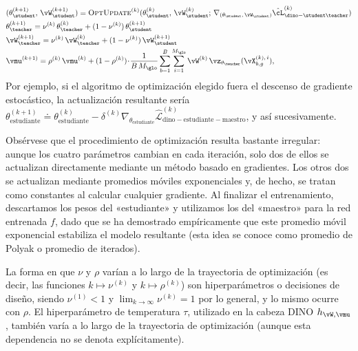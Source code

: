 \documentclass[../../book-main_es.tex]{subfiles}
\begin{document}
\begin{itemize}
\begin{align}
            &(\theta_{\student}^{(k + 1)},\, \vW_{\student}^{(k + 1)})
            = \textsc{OptUpdate}^{(k)}(\theta_{\student}^{(k)},\,
                \vW_{\student}^{(k)};\,
                \nabla_{(\theta_{\student},\, \vW_{\student})}
                \hat{\cL}_{\dino-\student\teacher}^{(k)}) \\
            &\theta_{\teacher}^{(k + 1)}
            = \nu^{(k)}\,\theta_{\teacher}^{(k)}
              + (1 - \nu^{(k)})\,\theta_{\student}^{(k + 1)} \\
            &\vW_{\teacher}^{(k + 1)}
            = \nu^{(k)}\,\vW_{\teacher}^{(k)}
              + (1 - \nu^{(k)})\,\vW_{\student}^{(k + 1)} \\
            &\vmu^{(k + 1)}
            = \rho^{(k)}\,\vmu^{(k)}
              + (1 - \rho^{(k)})\!\cdot\!
                \frac{1}{B\,M_{\glo}}
                \sum_{b = 1}^{B}\sum_{i = 1}^{M_{\glo}}
                \vW^{(k)}\,\vz_{\theta_{\teacher}}(\vX_{b,g}^{(k),\,i}),
        \end{align}
        Por ejemplo, si el algoritmo de optimización elegido fuera 
        el descenso de gradiente estocástico, la actualización resultante sería
        \( \theta_{\text{estudiante}}^{(k+1)} \doteq \theta_{\text{estudiante}}^{(k)} 
            - 
        \delta^{(k)}\nabla_{\theta_{\text{estudiante}}}\hat{\mathcal{L}}_{\text{dino}-\text{estudiante}-\text{maestro}}^{(k)} \),
        y así sucesivamente.
\end{itemize}
Obsérvese que el procedimiento de optimización resulta bastante irregular: aunque 
los cuatro parámetros cambian en cada iteración, solo dos de ellos se actualizan 
directamente mediante un método basado en gradientes. Los otros dos se 
actualizan mediante promedios móviles exponenciales y, de hecho, se tratan como 
constantes al calcular cualquier gradiente. Al finalizar el entrenamiento, 
descartamos los pesos del «estudiante» y utilizamos los del «maestro» para la red entrenada 
\(f\), dado que se ha demostrado empíricamente que este promedio móvil exponencial 
estabiliza el modelo resultante (esta idea se 
conoce como promedio de Polyak o promedio de iterados).

La forma en que \(\nu\) y \(\rho\) varían a lo largo de la trayectoria de optimización
(es decir, las funciones \(k \mapsto \nu^{(k)}\) y \(k
\mapsto \rho^{(k)}\)) son hiperparámetros o decisiones de diseño, siendo
\(\nu^{(1)} < 1\) y \(\lim_{k \to \infty}\nu^{(k)} = 1\) por lo general,
y lo mismo ocurre con \(\rho\). El hiperparámetro de temperatura \(\tau\),
utilizado en la cabeza DINO \(h_{\vW, \vmu}\), también varía a lo largo de la
trayectoria de optimización (aunque esta dependencia no se denota explícitamente).
\end{document}
